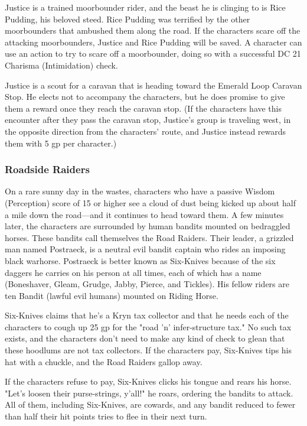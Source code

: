 \documentclass[10pt,a4paper,twoside,bg=print,twocolumn,openany,nodeprecatedcode]{dndbook}
\begin{document}
Justice is a trained moorbounder rider, and the beast he is clinging to is Rice Pudding, his beloved steed. Rice Pudding was terrified by the other moorbounders that ambushed them along the road. If the characters scare off the attacking moorbounders, Justice and Rice Pudding will be saved. A character can use an action to try to scare off a moorbounder, doing so with a successful DC 21 Charisma (Intimidation) check.

Justice is a scout for a caravan that is heading toward the Emerald Loop Caravan Stop. He elects not to accompany the characters, but he does promise to give them a reward once they reach the caravan stop. (If the characters have this encounter after they pass the caravan stop, Justice's group is traveling west, in the opposite direction from the characters' route, and Justice instead rewards them with 5 gp per character.)

\subsubsection{Roadside Raiders}
On a rare sunny day in the wastes, characters who have a passive Wisdom (Perception) score of 15 or higher see a cloud of dust being kicked up about half a mile down the road—and it continues to head toward them. A few minutes later, the characters are surrounded by human bandits mounted on bedraggled horses. These bandits call themselves the Road Raiders. Their leader, a grizzled man named Postraeck, is a neutral evil bandit captain who rides an imposing black warhorse. Postraeck is better known as Six-Knives because of the six daggers he carries on his person at all times, each of which has a name (Boneshaver, Gleam, Grudge, Jabby, Pierce, and Tickles). His fellow riders are ten Bandit (lawful evil humans) mounted on Riding Horse.

Six-Knives claims that he's a Kryn tax collector and that he needs each of the characters to cough up 25 gp for the "road 'n' infer-structure tax." No such tax exists, and the characters don't need to make any kind of check to glean that these hoodlums are not tax collectors. If the characters pay, Six-Knives tips his hat with a chuckle, and the Road Raiders gallop away.

If the characters refuse to pay, Six-Knives clicks his tongue and rears his horse. "Let's loosen their purse-strings, y'all!" he roars, ordering the bandits to attack. All of them, including Six-Knives, are cowards, and any bandit reduced to fewer than half their hit points tries to flee in their next turn.
\end{document}
